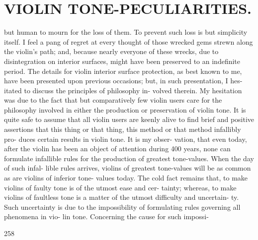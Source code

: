 \documentclass{article}
\begin{document}
\section*{VIOLIN TONE-PECULIARITIES.}
but human to mourn for the loss of them. To prevent such loss is but simplicity itself. I feel a pang of regret at every thought of those wrecked gems strewn along the violin's path; and, because nearly everyone of these wrecks, due to disintegration on interior surfaces, might have been preserved to an indefinite period. The details for violin interior surface protection, as best known to me, have been presented upon previous occasions; but, in such presentation, I hes- itated to discuss the principles of philosophy in- volved therein. My hesitation was due to the fact that but comparatively few violin users care for the philosophy involved in either the production or preservation of violin tone. It is quite safe to assume that all violin users are keenly alive to find brief and positive assertions that this thing or that thing, this method or that method infallibly pro- duces certain results in violin tone. It is my obser- vation, that even today, after the violin has been an object of attention during 400 years, none can formulate infallible rules for the production of greatest tone-values. When the day of such infal- lible rules arrives, violins of greatest tone-values will be as common as are violins of inferior tone- values today. The cold fact remains that, to make violins of faulty tone is of the utmost ease and cer- tainty; whereas, to make violins of faultless tone is a matter of the utmost difficulty and uncertain- ty. Such uncertainty is due to the impossibility of formulating rules governing all phenomena in vio- lin tone. Concerning the cause for such impossi-

258
\end{document}
